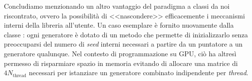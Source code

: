 Concludiamo menzionando un altro vantaggio del paradigma a classi da noi riscontrato, ovvero la possibilità di <<nascondere>> efficacemente i meccanismi interni della libreria all'utente. Un caso esemplare è fornito nuovamente dalla classe : ogni generatore è dotato di un metodo  che permette di inizializzarlo senza preoccuparsi del numero di \textit{seed} interni necessari a partire da un puntatore a un generatore qualunque. Nel contesto di programmazione su GPU, ciò ha altresì permesso di risparmiare spazio in memoria evitando di allocare una matrice di $4 N_\text{thread}$  necessari per istanziare un generatore combinato indipendente per \textit{thread}.